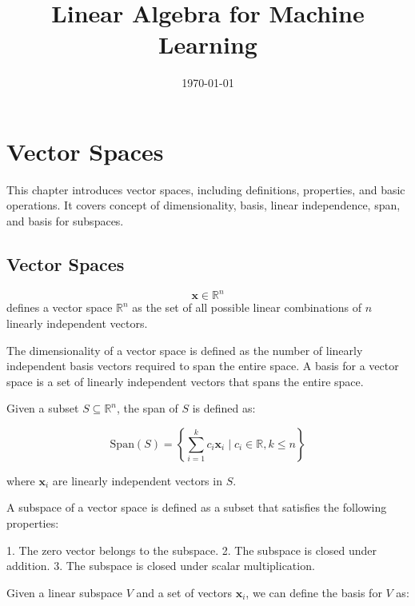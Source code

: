 \documentclass{report}%
\title{Linear Algebra for Machine Learning}%
\date{\today}%
\begin{document}
%
\normalsize%
\maketitle%
\tableofcontents%
%
\chapter{Vector Spaces}%
This chapter introduces vector spaces, including definitions, properties, and basic operations. It covers concept of dimensionality, basis, linear independence, span, and basis for subspaces.

%
\section{Vector Spaces}

\label{sec:vector-spaces}
\begin{equation}
\mathbf{x} \in \mathbb{R}^n
\end{equation}
defines a vector space $\mathbb{R}^n$ as the set of all possible linear combinations of $n$ linearly independent vectors.

The dimensionality of a vector space is defined as the number of linearly independent basis vectors required to span the entire space. A basis for a vector space is a set of linearly independent vectors that spans the entire space.

\label{def:span}
Given a subset $S \subseteq \mathbb{R}^n$, the span of $S$ is defined as:

$$
\text{Span}(S) = \left\{
\sum_{i=1}^{k} c_i \mathbf{x}_i \mid c_i \in \mathbb{R}, k \leq n
\right\}
$$

where $\mathbf{x}_i$ are linearly independent vectors in $S$.

A subspace of a vector space is defined as a subset that satisfies the following properties:

1. The zero vector belongs to the subspace.
2. The subspace is closed under addition.
3. The subspace is closed under scalar multiplication.

\label{def:subspace}
Given a linear subspace $V$ and a set of vectors $\mathbf{x}_i$, we can define the basis for $V$ as:
\end{document}
